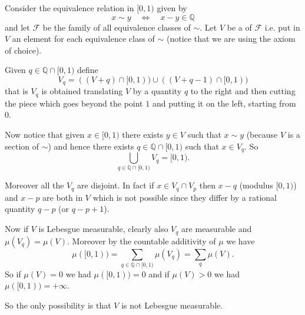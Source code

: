 \documentclass[12pt]{article}
\theoremstyle{remark}
\begin{document}
Consider the equivalence relation in $[0,1)$ given by
\[
  x\sim y \quad \Leftrightarrow\quad x-y\in\mathbb Q
\]
and let $\mathcal F$ be the family of all equivalence classes of $\sim$.
Let $V$ be a  of $\mathcal F$ i.e. put in $V$ an 
element for each equivalence class of $\sim$ (notice that we are using the axiom 
of choice).

Given $q\in\mathbb Q\cap [0,1)$ define 
\[
V_q=((V+q)\cap [0,1))\cup((V+q-1)\cap[0,1))
\]
that is $V_q$ is obtained translating $V$ by a quantity $q$ to the right and then cutting the piece which goes beyond the point $1$ and putting it on the left, starting from $0$.

Now notice that given $x\in[0,1)$ there exists $y\in V$ such that $x\sim y$ (because $V$ is a section of $\sim$) and hence there exists $q\in \mathbb Q\cap[0,1)$ 
such that $x\in V_q$. So 
\[
\bigcup_{q\in\mathbb Q\cap[0,1)} V_q = [0,1).
\]

Moreover all the $V_q$ are disjoint. In fact if $x\in V_q\cap V_p$ then $x-q$ (modulus $[0,1)$) and $x-p$ are both in $V$ which is not possible since they differ by a rational quantity $q-p$ (or $q-p+1$).

Now if $V$ is Lebesgue measurable, clearly also $V_q$ are measurable and $\mu(V_q)=\mu(V)$. Moreover by the countable additivity of $\mu$ we have
\[
  \mu([0,1)) = \sum_{q\in \mathbb Q\cap[0,1)} \mu(V_q) 
  = \sum_q \mu(V).
\]
So if $\mu(V)=0$ we had $\mu([0,1))=0$ and if $\mu(V)>0$ we had $\mu([0,1))=+\infty$.

So the only possibility is that $V$ is not Lebesgue measurable.
\end{document}

